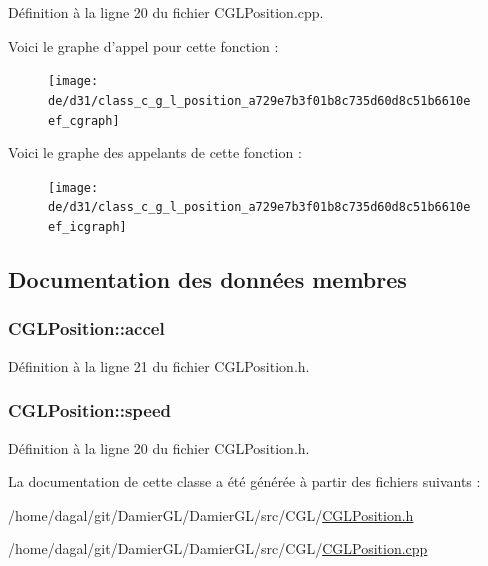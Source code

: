 Définition à la ligne 20 du fichier C\-G\-L\-Position.\-cpp.



Voici le graphe d'appel pour cette fonction \-:
\nopagebreak
\begin{figure}[H]
\begin{center}
\leavevmode
\texttt{[image: de/d31/class\_c\_g\_l\_position\_a729e7b3f01b8c735d60d8c51b6610eef\_cgraph]}
\end{center}
\end{figure}




Voici le graphe des appelants de cette fonction \-:
\nopagebreak
\begin{figure}[H]
\begin{center}
\leavevmode
\texttt{[image: de/d31/class\_c\_g\_l\_position\_a729e7b3f01b8c735d60d8c51b6610eef\_icgraph]}
\end{center}
\end{figure}




\subsection{Documentation des données membres}
\hypertarget{class_c_g_l_position_abb7ae2f19acbbcc53d685c9ee0e948ce}{
\subsubsection[{accel}]{ C\-G\-L\-Position\-::accel\hspace{0.3cm}{\ttfamily [protected]}}}\label{class_c_g_l_position_abb7ae2f19acbbcc53d685c9ee0e948ce}


Définition à la ligne 21 du fichier C\-G\-L\-Position.\-h.

\hypertarget{class_c_g_l_position_ac5a3b64ac5c800b84a3b621e6e50c381}{
\subsubsection[{speed}]{ C\-G\-L\-Position\-::speed\hspace{0.3cm}{\ttfamily [protected]}}}\label{class_c_g_l_position_ac5a3b64ac5c800b84a3b621e6e50c381}


Définition à la ligne 20 du fichier C\-G\-L\-Position.\-h.



La documentation de cette classe a été générée à partir des fichiers suivants \-:\begin{DoxyCompactItemize}
\item 
/home/dagal/git/\-Damier\-G\-L/\-Damier\-G\-L/src/\-C\-G\-L/\hyperlink{_c_g_l_position_8h}{C\-G\-L\-Position.\-h}\item 
/home/dagal/git/\-Damier\-G\-L/\-Damier\-G\-L/src/\-C\-G\-L/\hyperlink{_c_g_l_position_8cpp}{C\-G\-L\-Position.\-cpp}\end{DoxyCompactItemize}
